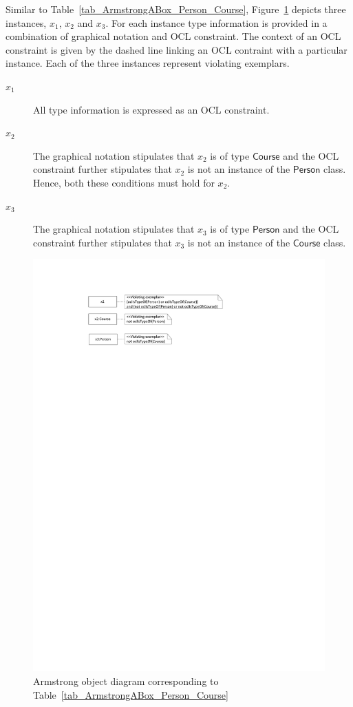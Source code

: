 \documentclass{amsart}
\begin{document}
    Similar to Table~\ref{tab_ArmstrongABox_Person_Course}, Figure~\ref{fig_ArmstrongOD_Person_Course} depicts three instances, $x_1$, $x_2$ and $x_3$. For each instance type information is provided in a combination of graphical notation and OCL constraint. The context of an OCL constraint is given by the dashed line linking an OCL contraint with a particular instance.  Each of the three instances represent violating exemplars.
    \begin{description}
     \item[$x_1$] All type information is expressed as an OCL constraint.
     \item[$x_2$] The graphical notation stipulates that $x_2$ is of type $\mathsf{Course}$ and the OCL constraint further stipulates that $x_2$ is not an instance of the $\mathsf{Person}$ class.  Hence, both these conditions must hold for $x_2$.
     \item[$x_3$] The graphical notation stipulates that $x_3$ is of type $\mathsf{Person}$ and the OCL constraint further stipulates that $x_3$ is not an instance of the $\mathsf{Course}$ class.     
    \end{description} 
   
    
    \begin{figure}
    \centering \includegraphics[trim = 30mm 234mm 55mm 25mm, clip, scale=0.9]{./ArmstrongOD_Person_Course.pdf}
    \caption{Armstrong object diagram corresponding to Table~\ref{tab_ArmstrongABox_Person_Course}}\label{fig_ArmstrongOD_Person_Course}
    \end{figure}   
\end{document}
